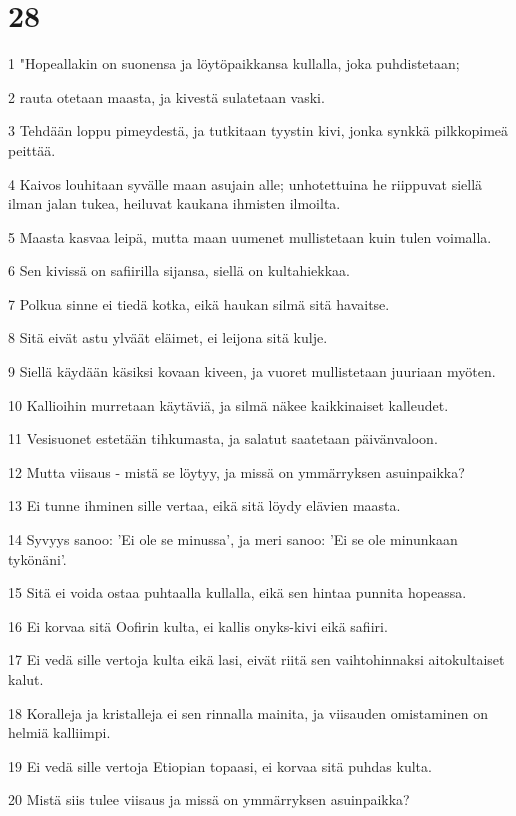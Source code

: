 \chapter{28}

\par 1 "Hopeallakin on suonensa ja löytöpaikkansa kullalla, joka puhdistetaan;
\par 2 rauta otetaan maasta, ja kivestä sulatetaan vaski.
\par 3 Tehdään loppu pimeydestä, ja tutkitaan tyystin kivi, jonka synkkä pilkkopimeä peittää.
\par 4 Kaivos louhitaan syvälle maan asujain alle; unhotettuina he riippuvat siellä ilman jalan tukea, heiluvat kaukana ihmisten ilmoilta.
\par 5 Maasta kasvaa leipä, mutta maan uumenet mullistetaan kuin tulen voimalla.
\par 6 Sen kivissä on safiirilla sijansa, siellä on kultahiekkaa.
\par 7 Polkua sinne ei tiedä kotka, eikä haukan silmä sitä havaitse.
\par 8 Sitä eivät astu ylväät eläimet, ei leijona sitä kulje.
\par 9 Siellä käydään käsiksi kovaan kiveen, ja vuoret mullistetaan juuriaan myöten.
\par 10 Kallioihin murretaan käytäviä, ja silmä näkee kaikkinaiset kalleudet.
\par 11 Vesisuonet estetään tihkumasta, ja salatut saatetaan päivänvaloon.
\par 12 Mutta viisaus - mistä se löytyy, ja missä on ymmärryksen asuinpaikka?
\par 13 Ei tunne ihminen sille vertaa, eikä sitä löydy elävien maasta.
\par 14 Syvyys sanoo: 'Ei ole se minussa', ja meri sanoo: 'Ei se ole minunkaan tykönäni'.
\par 15 Sitä ei voida ostaa puhtaalla kullalla, eikä sen hintaa punnita hopeassa.
\par 16 Ei korvaa sitä Oofirin kulta, ei kallis onyks-kivi eikä safiiri.
\par 17 Ei vedä sille vertoja kulta eikä lasi, eivät riitä sen vaihtohinnaksi aitokultaiset kalut.
\par 18 Koralleja ja kristalleja ei sen rinnalla mainita, ja viisauden omistaminen on helmiä kalliimpi.
\par 19 Ei vedä sille vertoja Etiopian topaasi, ei korvaa sitä puhdas kulta.
\par 20 Mistä siis tulee viisaus ja missä on ymmärryksen asuinpaikka?
